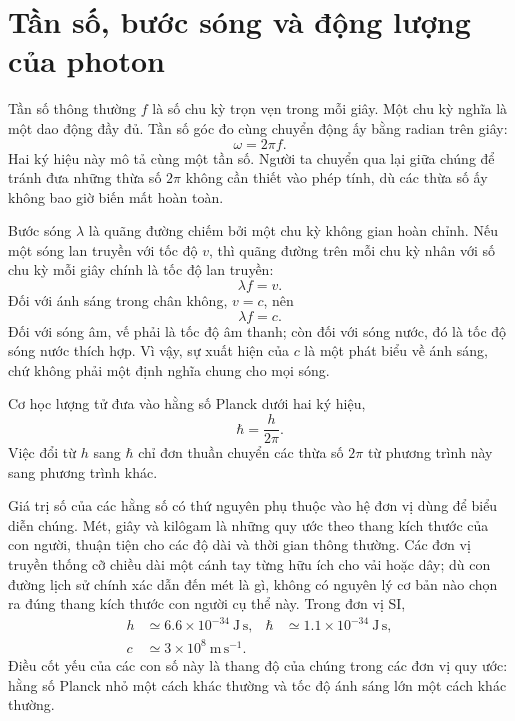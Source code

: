 \section{Tần số, bước sóng và động lượng của photon}

Tần số thông thường \(f\) là số chu kỳ trọn vẹn trong mỗi giây. Một chu kỳ nghĩa là một dao động đầy đủ. Tần số góc đo cùng chuyển động ấy bằng radian trên giây:
\begin{equation}
\omega=2\pi f.
\end{equation}
Hai ký hiệu này mô tả cùng một tần số. Người ta chuyển qua lại giữa chúng để tránh đưa những thừa số \(2\pi\) không cần thiết vào phép tính, dù các thừa số ấy không bao giờ biến mất hoàn toàn.

Bước sóng \(\lambda\) là quãng đường chiếm bởi một chu kỳ không gian hoàn chỉnh. Nếu một sóng lan truyền với tốc độ \(v\), thì quãng đường trên mỗi chu kỳ nhân với số chu kỳ mỗi giây chính là tốc độ lan truyền:
\begin{equation}
\lambda f=v.
\end{equation}
Đối với ánh sáng trong chân không, \(v=c\), nên
\begin{equation}
\lambda f=c.
\end{equation}
Đối với sóng âm, vế phải là tốc độ âm thanh; còn đối với sóng nước, đó là tốc độ sóng nước thích hợp. Vì vậy, sự xuất hiện của \(c\) là một phát biểu về ánh sáng, chứ không phải một định nghĩa chung cho mọi sóng.

Cơ học lượng tử đưa vào hằng số Planck dưới hai ký hiệu,
\begin{equation}
\hbar=\frac{h}{2\pi}.
\end{equation}
Việc đổi từ \(h\) sang \(\hbar\) chỉ đơn thuần chuyển các thừa số \(2\pi\) từ phương trình này sang phương trình khác.

Giá trị số của các hằng số có thứ nguyên phụ thuộc vào hệ đơn vị dùng để biểu diễn chúng. Mét, giây và kilôgam là những quy ước theo thang kích thước của con người, thuận tiện cho các độ dài và thời gian thông thường. Các đơn vị truyền thống cỡ chiều dài một cánh tay từng hữu ích cho vải hoặc dây; dù con đường lịch sử chính xác dẫn đến mét là gì, không có nguyên lý cơ bản nào chọn ra đúng thang kích thước con người cụ thể này. Trong đơn vị SI,
\begin{equation}
\begin{aligned}
h &\simeq 6.6\times10^{-34}\ \mathrm{J\,s},
&\hbar &\simeq 1.1\times10^{-34}\ \mathrm{J\,s},\\
c &\simeq 3\times10^8\ \mathrm{m\,s^{-1}}.
\end{aligned}
\end{equation}
Điều cốt yếu của các con số này là thang độ của chúng trong các đơn vị quy ước: hằng số Planck nhỏ một cách khác thường và tốc độ ánh sáng lớn một cách khác thường.

